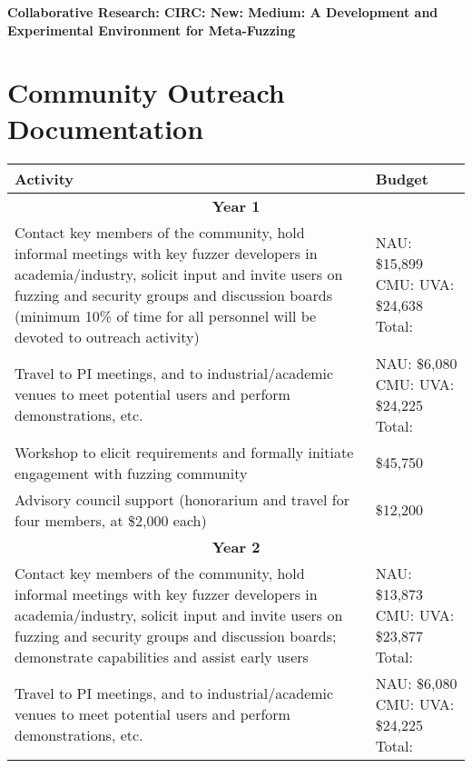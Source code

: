 \documentclass[12pt]{article}
\begin{document}
\begin{center} {\Large\sf\textbf{Collaborative Research: CIRC: New: Medium: A
      Development and Experimental Environment for Meta-Fuzzing}}
\end{center}

\section*{Community Outreach Documentation}


\begin{table}
  \begin{tabular}{|p{12cm}|p{3cm}|}
    \hline
    {\bf Activity} & {\bf Budget} \\
    \hline 
    \multicolumn{2}{c}{{\bf Year 1}} \\
    \hline
    Contact key members of the community, hold informal meetings with
    key fuzzer developers in academia/industry, solicit input and
    invite users
    on fuzzing and security groups and discussion boards (minimum 10\% of time for all
    personnel will be devoted to outreach activity) &  NAU: \$15,899 CMU: UVA: \$24,638
                                                      Total:  \\
    \hline
    Travel to PI meetings, and to industrial/academic venues to meet
    potential users and perform demonstrations, etc. & NAU: \$6,080
                                                       CMU: UVA:
                                                       \$24,225 Total:\\
    \hline
    Workshop to elicit requirements and formally initiate engagement
    with fuzzing community & \$45,750 \\
    \hline 
    Advisory council support (honorarium and travel for four members, 
    at \$2,000 each) & \$12,200 \\
    \hline
    \hline
    \multicolumn{2}{c}{{\bf Year 2}} \\
    \hline
    \hline
    Contact key members of the community, hold informal meetings with
    key fuzzer developers in academia/industry, solicit input and
    invite users
    on fuzzing and security groups and discussion boards; demonstrate
    capabilities and assist early users&  NAU:  \$13,873 CMU: UVA: \$23,877
                                                      Total:  \\
    \hline
    Travel to PI meetings, and to industrial/academic venues to meet
    potential users and perform demonstrations, etc. & NAU: \$6,080 CMU: UVA:  \$24,225 Total:\\

\end{tabular}
\end{table}
\end{document}
